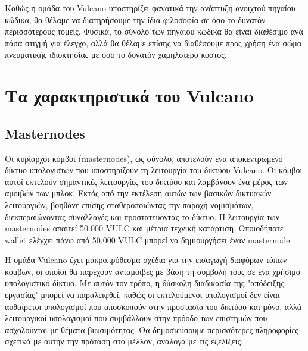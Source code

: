 \documentclass[A4paper, 12pt]{article}
\begin{document}
Καθώς η ομάδα του Vulcano υποστηρίζει φανατικά την ανάπτυξη ανοιχτού πηγαίου κώδικα, θα θέλαμε να διατηρήσουμε την ίδια φιλοσοφία σε όσο το δυνατόν περισσότερους τομείς. Φυσικά, το σύνολο των πηγαίου κώδικα θα είναι διαθέσιμο ανά πάσα στιγμή για έλεγχο, αλλά θα θέλαμε επίσης να διαθέσουμε προς χρήση ένα σώμα πνευματικής ιδιοκτησίας με όσο το δυνατόν χαμηλότερο κόστος.

\section{Τα χαρακτηριστικά του Vulcano}
\subsection {Masternodes}
Οι κυρίαρχοι κόμβοι (masternodes), ως σύνολο, αποτελούν ένα αποκεντρωμένο δίκτυο υπολογιστών που υποστηρίζουν τη λειτουργία του δικτύου Vulcano. Οι κόμβοι αυτοί εκτελούν σημαντικές λειτουργίες του δικτύου και λαμβάνουν ένα μέρος των αμοιβών των μπλοκ. Εκτός από την εκτέλεση αυτών των βασικών δικτυακών λειτουργιών, βοηθάνε επίσης σταθεροποιώντας την παροχή νομισμάτων, διεκπεραιώνοντας συναλλαγές και προστατεύοντας το δίκτυο. Η λειτουργία των masternodes απαιτεί 50.000 VULC και μέτρια τεχνική κατάρτιση. Οποιοδήποτε wallet ελέγχει πάνω από 50.000 VULC μπορεί να δημιουργήσει έναν masternode.

Η ομάδα Vulcano έχει μακροπρόθεσμα σχέδια για την εισαγωγή διαφόρων τύπων κόμβων, οι οποίοι θα παρέχουν ανταμοιβές με βάση τη συμβολή τους σε ένα χρήσιμο υπολογιστικό δίκτυο. Με αυτόν τον τρόπο, η δύσκολη διαδικασία της "απόδειξης εργασίας" μπορεί να παραλειφθεί, καθώς οι εκτελούμενοι υπολογισμοί δεν είναι αυθαίρετοι υπολογισμοί που αποσκοπούν στην προστασία του δικτύου και μόνο, αλλά λειτουργικοί υπολογισμοί που συμβάλλουν στην πρόοδο των επιστημών που ασχολούνται με θέματα βιωσιμότητας. Θα δημοσιεύσουμε περισσότερες πληροφορίες σχετικά με αυτήν την πρόταση στο μέλλον, ανάλογα με τις εξελίξεις.
\end{document}
